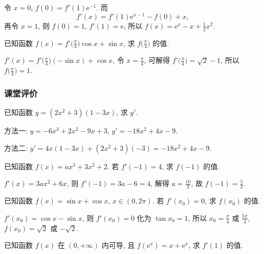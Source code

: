   \beginsolution
    令 $x=0$, $f(0)=f'(1)\mathrm{e}^{-1}$. 而
    \[f'(x)=f'(1)\mathrm{e}^{x-1}-f(0)+x,\]
    再令 $x=1$, 则 $f(0)=1$, $f'(1)=\mathrm{e}$, 所以 $f(x)=\mathrm{e}^x-x+\frac12x^2$.
  \endsolution
  
  \lianxi
  \begin{exercise}[s]
    已知函数 $f(x)=f'\Big(\frac{\pi}4\Big)\cos x+\sin x$, 
    求 $f\Big(\frac{\pi}4\Big)$ 的值.
  \end{exercise}

  \beginsolution
    $f'(x)=f'\Big(\frac{\pi}4\Big)(-\sin x)+\cos x$, 令 $x=\frac\pi4$, 可解得
    $f'\Big(\frac{\pi}4\Big)=\sqrt2-1$, 所以 $f\Big(\frac{\pi}4\Big)=1$.
  \endsolution
  
  \subsubsection{课堂评价}
  \begin{exercise}
    已知函数 $y=(2x^2 +3)(1-3x)$, 求 $y'$.
  \end{exercise}

  \beginsolution
    方法一: $y=-6x^3+2x^2-9x+3$, $y'=-18x^2+4x-9$.
    
    方法二: $y'=4x(1-3x)+(2x^2+3)(-3)=-18x^2+4x-9$.
    
  \endsolution
  
  \begin{exercise}
    已知函数 $f(x)=ax^3 +3x^2 +2$. 若 $f'(-1)=4$, 求 $f(-1)$ 的值.
  \end{exercise}

  \beginsolution
    $f'(x)=3ax^2+6x$, 则 $f'(-1)=3a-6=4$, 解得 $a=\frac{10}3$, 故 $f(-1)=\frac53$.
  \endsolution
  
  \begin{exercise}
    已知函数 $f(x)=\sin x+\cos x$, $x\in(0,2\pi)$. 
    若 $f'(x_0)=0$, 求 $f(x_0)$ 的值.
  \end{exercise}

  \beginsolution
    $f'(x_0)=\cos x-\sin x$, 则 $f'(x_0)=0$ 化为 $\tan x_0=1$, 所以 $x_0=\frac\pi4$ 或 $\frac{5\pi}4$, $f(x_0)=\sqrt2$ 或 $-\sqrt2$.
  \endsolution
  
  \begin{exercise}
    已知函数 $f(x)$ 在 $(0,+\infty)$ 内可导, 
    且 $f(\mathrm{e}^x)=x+\mathrm{e}^x$, 求 $f'(1)$ 的值.
  \end{exercise}

